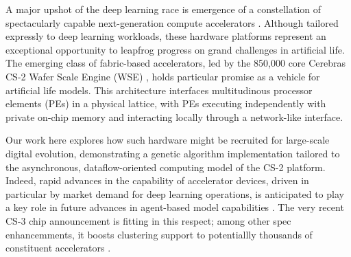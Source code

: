 

A major upshot of the deep learning race is emergence of a constellation of spectacularly capable next-generation compute accelerators \citep{zhang2016cambricon,emani2021accelerating,jia2019dissecting,medina2020habana}.
Although tailored expressly to deep learning workloads, these hardware platforms represent an exceptional opportunity to leapfrog progress on grand challenges in artificial life.
The emerging class of fabric-based accelerators, led by the 850,000 core Cerebras CS-2 Wafer Scale Engine (WSE) \citep{lauterbach2021path,lie2022cerebras}, holds particular promise as a vehicle for artificial life models.
This architecture interfaces multitudinous processor elements (PEs) in a physical lattice, with PEs executing independently with private on-chip memory and interacting locally through a network-like interface.

Our work here explores how such hardware might be recruited for large-scale digital evolution, demonstrating a genetic algorithm implementation tailored to the asynchronous, dataflow-oriented computing model of the CS-2 platform.
Indeed, rapid advances in the capability of accelerator devices, driven in particular by market demand for deep learning operations, is anticipated to play a key role in future advances in agent-based model capabilities \citep{perumalla2022computer}.
The very recent CS-3 chip announcement is fitting in this respect; among other spec enhancemments, it boosts clustering support to potentiallly thousands of constituent accelerators \citep{moore2024cerebras}.

